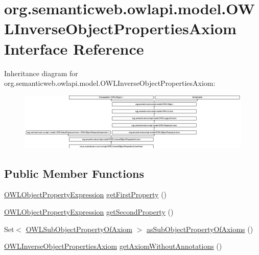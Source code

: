 \hypertarget{interfaceorg_1_1semanticweb_1_1owlapi_1_1model_1_1_o_w_l_inverse_object_properties_axiom}{\section{org.\-semanticweb.\-owlapi.\-model.\-O\-W\-L\-Inverse\-Object\-Properties\-Axiom Interface Reference}
\label{interfaceorg_1_1semanticweb_1_1owlapi_1_1model_1_1_o_w_l_inverse_object_properties_axiom}
}
Inheritance diagram for org.\-semanticweb.\-owlapi.\-model.\-O\-W\-L\-Inverse\-Object\-Properties\-Axiom\-:\begin{figure}[H]
\begin{center}
\leavevmode
\includegraphics[height=2.750154cm]{interfaceorg_1_1semanticweb_1_1owlapi_1_1model_1_1_o_w_l_inverse_object_properties_axiom}
\end{center}
\end{figure}
\subsection*{Public Member Functions}
\begin{DoxyCompactItemize}
\item 
\hyperlink{interfaceorg_1_1semanticweb_1_1owlapi_1_1model_1_1_o_w_l_object_property_expression}{O\-W\-L\-Object\-Property\-Expression} \hyperlink{interfaceorg_1_1semanticweb_1_1owlapi_1_1model_1_1_o_w_l_inverse_object_properties_axiom_ae21329a6975759b226fb111443d5abf9}{get\-First\-Property} ()
\item 
\hyperlink{interfaceorg_1_1semanticweb_1_1owlapi_1_1model_1_1_o_w_l_object_property_expression}{O\-W\-L\-Object\-Property\-Expression} \hyperlink{interfaceorg_1_1semanticweb_1_1owlapi_1_1model_1_1_o_w_l_inverse_object_properties_axiom_a7b45061090bc0945d82551a7ab1be779}{get\-Second\-Property} ()
\item 
Set$<$ \hyperlink{interfaceorg_1_1semanticweb_1_1owlapi_1_1model_1_1_o_w_l_sub_object_property_of_axiom}{O\-W\-L\-Sub\-Object\-Property\-Of\-Axiom} $>$ \hyperlink{interfaceorg_1_1semanticweb_1_1owlapi_1_1model_1_1_o_w_l_inverse_object_properties_axiom_a6b3482fed4f0c2d728262d484f0700ab}{as\-Sub\-Object\-Property\-Of\-Axioms} ()
\item 
\hyperlink{interfaceorg_1_1semanticweb_1_1owlapi_1_1model_1_1_o_w_l_inverse_object_properties_axiom}{O\-W\-L\-Inverse\-Object\-Properties\-Axiom} \hyperlink{interfaceorg_1_1semanticweb_1_1owlapi_1_1model_1_1_o_w_l_inverse_object_properties_axiom_a26ffaba92d0c10162a817238d64c9cbf}{get\-Axiom\-Without\-Annotations} ()
\end{DoxyCompactItemize}


